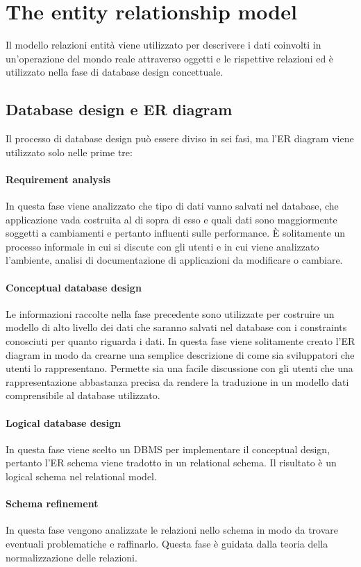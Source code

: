 \chapter{The entity relationship model}
Il modello relazioni entit\`a viene utilizzato per descrivere i dati coinvolti in un'operazione del mondo reale attraverso oggetti e le rispettive relazioni ed \`e utilizzato nella fase di database design concettuale. 
\section{Database design e ER diagram}
Il processo di database design pu\`o essere diviso in sei fasi, ma l'ER diagram viene utilizzato solo nelle prime tre:
\subsubsection{Requirement analysis}
In questa fase viene analizzato che tipo di dati vanno salvati nel database, che applicazione vada costruita al di sopra di esso e quali dati sono maggiormente soggetti a cambiamenti e pertanto influenti sulle 
performance. \`E solitamente un processo informale in cui si discute con gli utenti e in cui viene analizzato l'ambiente, analisi di documentazione di applicazioni da modificare o cambiare. 
\subsubsection{Conceptual database design}
Le informazioni raccolte nella fase precedente sono utilizzate per costruire un modello di alto livello dei dati che saranno salvati nel database con i constraints conosciuti per quanto riguarda i dati. In questa fase 
viene solitamente creato l'ER diagram in modo da crearne una semplice descrizione di come sia sviluppatori che utenti lo rappresentano. Permette sia una facile discussione con gli utenti che una 
rappresentazione abbastanza precisa da rendere la traduzione in un modello dati comprensibile al database utilizzato.
\subsubsection{Logical database design}
In questa fase viene scelto un DBMS per implementare il conceptual design, pertanto l'ER schema viene tradotto in un relational schema. Il risultato \`e un logical schema nel relational model. 
\subsubsection{Schema refinement}
In questa fase vengono analizzate le relazioni nello schema in modo da trovare eventuali problematiche e raffinarlo. Questa fase \`e guidata dalla teoria della normalizzazione delle relazioni.
